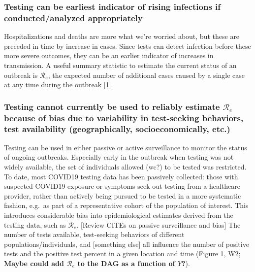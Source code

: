 \documentclass[]{article}
\begin{document}
\hypertarget{testing-can-be-earliest-indicator-of-rising-infections-if-conductedanalyzed-appropriately}{%
\subsubsection{Testing can be earliest indicator of rising infections if
conducted/analyzed
appropriately}\label{testing-can-be-earliest-indicator-of-rising-infections-if-conductedanalyzed-appropriately}}

Hospitalizations and deaths are more what we're worried about, but these
are preceded in time by increase in cases. Since tests can detect
infection before these more severe outcomes, they can be an earlier
indicator of increases in transmission. A useful summary statistic to
estimate the current status of an outbreak is \(\mathcal{R}_e\), the
expected number of additional cases caused by a single case at any time
during the outbreak {[}1{]}.

\hypertarget{testing-cannot-currently-be-used-to-reliably-estimate-mathcalr_e-because-of-bias-due-to-variability-in-test-seeking-behaviors-test-availability-geographically-socioeconomically-etc.}{%
\subsubsection{\texorpdfstring{Testing cannot currently be used to
reliably estimate \(\mathcal{R}_e\) because of bias due to variability
in test-seeking behaviors, test availability (geographically,
socioeconomically,
etc.)}{Testing cannot currently be used to reliably estimate \textbackslash mathcal\{R\}\_e because of bias due to variability in test-seeking behaviors, test availability (geographically, socioeconomically, etc.)}}\label{testing-cannot-currently-be-used-to-reliably-estimate-mathcalr_e-because-of-bias-due-to-variability-in-test-seeking-behaviors-test-availability-geographically-socioeconomically-etc.}}

Testing can be used in either passive or active surveillance to monitor
the status of ongoing outbreaks. Especially early in the outbreak when
testing was not widely available, the set of individuals allowed (wc?)
to be tested was restricted. To date, most COVID19 testing data has been
passively collected: those with suspected COVID19 exposure or symptoms
seek out testing from a healthcare provider, rather than actively being
pursued to be tested in a more systematic fashion, e.g.~as part of a
representative cohort of the population of interest. This introduces
considerable bias into epidemiological estimates derived from the
testing data, such as \(\mathcal{R}_e\). {[}Review CITEs on passive
surveillance and bias{]} The number of tests available, test-seeking
behaviors of different populations/individuals, and {[}something else{]}
all influence the number of positive tests and the positive test percent
in a given location and time (Figure 1, W2; \textbf{Maybe could add
\(\mathcal{R}_e\) to the DAG as a function of \(Y\)?}).
\end{document}
